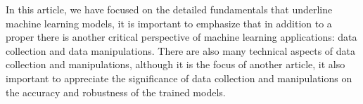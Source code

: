 
\par
In this article, we have focused on the detailed fundamentals that underline machine learning models, it is important to emphasize that in addition to a proper there is another critical perspective of machine learning applications: data collection and data manipulations. There are also many technical aspects of data collection and manipulations, although it is the focus of another article, it also important to appreciate the significance of data collection and manipulations on the accuracy and robustness of the trained models.
\par 
